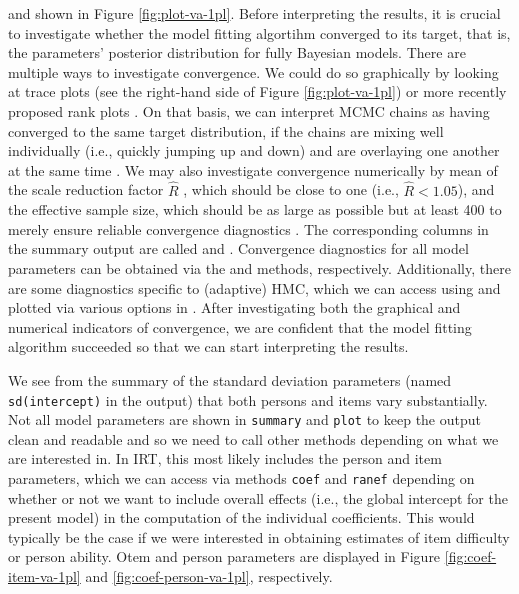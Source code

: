 \documentclass[jss]{jss}
\begin{document}
and shown in Figure \ref{fig:plot-va-1pl}. Before interpreting the
results, it is crucial to investigate whether the model fitting
algortihm converged to its target, that is, the parameters' posterior
distribution for fully Bayesian models. There are multiple ways to
investigate convergence. We could do so graphically by looking at trace
plots (see the right-hand side of Figure \ref{fig:plot-va-1pl}) or more
recently proposed rank plots \citep{vehtari2019}. On that basis, we can
interpret MCMC chains as having converged to the same target
distribution, if the chains are mixing well individually (i.e., quickly
jumping up and down) and are overlaying one another at the same time
\citep{gelman2013}. We may also investigate convergence numerically by
mean of the scale reduction factor \(\widehat{R}\)
\citep{gelman1992, gelman2013, vehtari2019}, which should be close to
one (i.e., \(\widehat{R} < 1.05\)), and the effective sample size, which
should be as large as possible but at least 400 to merely ensure
reliable convergence diagnostics \citep{vehtari2019}. The corresponding
columns in the summary output are called  and
. Convergence diagnostics for all model parameters can
be obtained via the  and  methods,
respectively. Additionally, there are some diagnostics specific to
(adaptive) HMC, which we can access using  and plotted
via various options in . After investigating both the
graphical and numerical indicators of convergence, we are confident that
the model fitting algorithm succeeded so that we can start interpreting
the results.

We see from the summary of the standard deviation parameters (named
\texttt{sd(intercept)} in the output) that both persons and items vary
substantially. Not all model parameters are shown in \texttt{summary}
and \texttt{plot} to keep the output clean and readable and so we need
to call other methods depending on what we are interested in. In IRT,
this most likely includes the person and item parameters, which we can
access via methods \texttt{coef} and \texttt{ranef} depending on whether
or not we want to include overall effects (i.e., the global intercept
for the present model) in the computation of the individual
coefficients. This would typically be the case if we were interested in
obtaining estimates of item difficulty or person ability. Otem and
person parameters are displayed in Figure \ref{fig:coef-item-va-1pl} and
\ref{fig:coef-person-va-1pl}, respectively.
\end{document}
